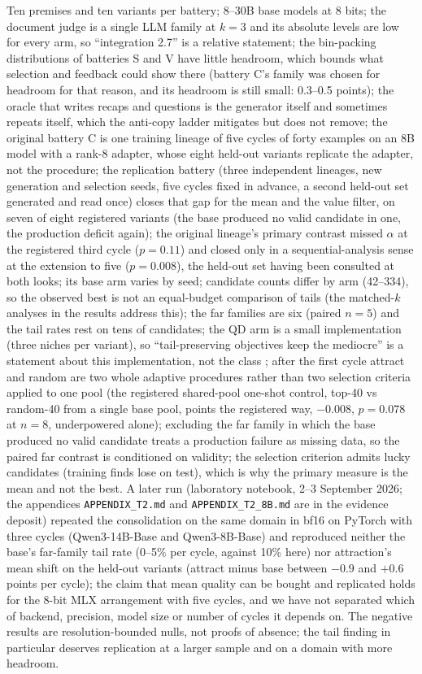 \documentclass[11pt]{article}
\begin{document}
Ten premises and ten variants per battery; 8--30B base models at 8 bits;
the document judge is a single LLM family at $k=3$ and its absolute levels
are low for every arm, so ``integration 2.7'' is a relative statement; the
bin-packing distributions of batteries S and V have little headroom, which
bounds what selection and feedback could show there (battery C's family was
chosen for headroom for that reason, and its headroom is still small:
0.3--0.5 points); the oracle that writes recaps and questions is the
generator itself and sometimes repeats itself, which the anti-copy ladder
mitigates but does not remove; the original battery C is one training
lineage of five cycles of forty examples on an 8B model with a rank-8
adapter, whose eight held-out variants replicate the adapter, not the
procedure; the replication battery (three independent lineages, new
generation and selection seeds, five cycles fixed in advance, a second
held-out set generated and read once) closes that gap for the mean and
the value filter, on seven of eight registered variants (the base
produced no valid candidate in one, the production deficit again); the
original lineage's primary
contrast missed $\alpha$ at the registered third cycle ($p=0.11$) and
closed only in a sequential-analysis sense at the extension to five
($p=0.008$), the held-out set having been consulted at both looks; its
base arm varies by seed; candidate counts differ by arm (42--334), so the
observed best is not an equal-budget comparison of tails (the matched-$k$
analyses in the results address this); the far families
are six (paired $n=5$) and the tail rates rest on tens of candidates; the
QD arm is a small implementation (three niches per variant), so
``tail-preserving objectives keep the mediocre'' is a statement about this
implementation, not the class \citep{wan2025loongflow}; after the
first cycle attract and random are two whole adaptive
procedures rather than two selection criteria applied to one pool (the
registered shared-pool one-shot control, top-40 vs random-40 from a
single base pool, points the registered way, $-0.008$, $p=0.078$ at
$n{=}8$, underpowered alone); excluding the far
family in which the base produced no valid candidate treats a production
failure as missing data, so the paired far contrast is conditioned on
validity; the selection criterion admits lucky candidates (training finds lose on
test), which is why the primary measure is the mean and not the best. A
later run (laboratory notebook, 2--3 September 2026; the appendices
\texttt{APPENDIX\_T2.md} and \texttt{APPENDIX\_T2\_8B.md} are in the evidence
deposit) repeated the consolidation on the same domain in
bf16 on PyTorch with three cycles (Qwen3-14B-Base and Qwen3-8B-Base) and
reproduced neither the base's far-family tail rate (0--5\% per cycle,
against 10\% here) nor attraction's mean shift on the held-out variants
(attract minus base between $-0.9$ and $+0.6$ points per cycle); the
claim that mean quality can be bought and replicated holds for the 8-bit
MLX arrangement with five cycles, and we have not separated which of
backend, precision, model size or number of cycles it depends on. The
negative results are resolution-bounded nulls, not proofs of absence; the
tail finding in particular deserves replication at a larger sample and on a
domain with more headroom.
\end{document}
